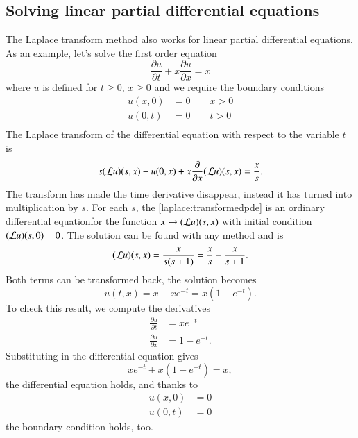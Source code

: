 \subsection{Solving linear partial differential equations}
The Laplace transform method also works for linear partial differential
equations.
As an example, let's solve the first order equation
\[
\frac{\partial u}{\partial t}+x\frac{\partial u}{\partial x}=x
\]
where $u$ is defined for $t\ge 0$, $x\ge 0$ and we require the
boundary conditions
\begin{align*}
u(x,0)&=0\qquad x>0\\
u(0,t)&=0\qquad t>0\\
\end{align*}
The Laplace transform of the differential equation with respect to
the variable $t$ is
\begin{equation}
s({\cal L}u)(s,x)-u(0,x)+x\frac{\partial}{\partial x}({\cal L}u)(s,x)
=
\frac{x}{s}.
\label{laplace:transformedpde}
\end{equation}
The transform has made the time derivative disappear, instead it has
turned into multiplication by $s$.
For each $s$, the \eqref{laplace:transformedpde} is an ordinary
differential equationfor the function $x\mapsto ({\cal L}u)(s,x)$
with initial condition
$({\cal L}u)(s,0)=0$.
The solution can be found with any method and is
\[
({\cal L}u)(s,x)=\frac{x}{s(s+1)}=\frac{x}{s}-\frac{x}{s+1}.
\]
Both terms can be transformed back, the solution becomes
\[
u(t,x)=x-xe^{-t}=x(1-e^{-t}).
\]
To check this result, we compute the derivatives
\begin{align*}
\frac{\partial u}{\partial t}
&=
xe^{-t}
\\
\frac{\partial u}{\partial x}
&=
1-e^{-t}.
\end{align*}
Substituting in the differential equation gives
\[
xe^{-t}+x(1-e^{-t})=x,
\]
the differential equation holds, and thanks to
\begin{align*}
u(x,0)
&=
0
\\
u(0,t)
&=
0
\end{align*}
the boundary condition holds, too.

